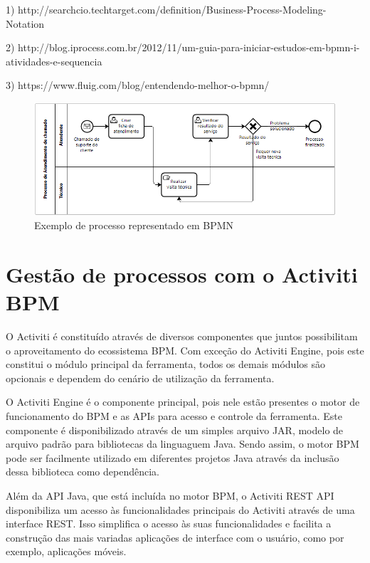 1) http://searchcio.techtarget.com/definition/Business-Process-Modeling-Notation

2) http://blog.iprocess.com.br/2012/11/um-guia-para-iniciar-estudos-em-bpmn-i-atividades-e-sequencia

3) https://www.fluig.com/blog/entendendo-melhor-o-bpmn/

\begin{figure}
  \centering
  \includegraphics[width=1.0\textwidth]{imagens/bpmn_example.png}
  \caption{Exemplo de processo representado em BPMN}
  \label{fig:exemplo_bpmn}
\end{figure}

\section{Gestão de processos com o Activiti BPM}\label{sec:activiti-gestao_processos}

O Activiti é constituído através de diversos componentes que juntos possibilitam o aproveitamento do ecossistema BPM. Com exceção do Activiti Engine, pois este constitui o módulo principal da ferramenta, todos os demais módulos são opcionais e dependem do cenário de utilização da ferramenta.

O Activiti Engine é o componente principal, pois nele estão presentes o motor de funcionamento do BPM e as APIs para acesso e controle da ferramenta. Este componente é disponibilizado através de um simples arquivo JAR, modelo de arquivo padrão para bibliotecas da linguaguem Java. Sendo assim, o motor BPM pode ser facilmente utilizado em diferentes projetos Java através da inclusão dessa biblioteca como dependência.

Além da API Java, que está incluída no motor BPM, o Activiti REST API disponibiliza um acesso às funcionalidades principais do Activiti através de uma interface REST. Isso simplifica o acesso às suas funcionalidades e facilita a construção das mais variadas aplicações de interface com o usuário, como por exemplo, aplicações móveis.

